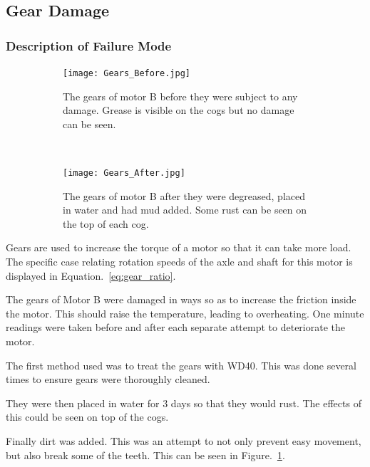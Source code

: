 
\subsection{Gear Damage}

\subsubsection{Description of Failure Mode}

\begin{figure}[t!]
    \centering
    \begin{subfigure}[t]{0.5\textwidth}
        \centering
        \texttt{[image: Gears\_Before.jpg]}
        \caption[Healthy Gears]{The gears of motor B before they were subject to any damage. Grease is visible on the cogs but no damage can be seen.}
    \end{subfigure}%
    ~ 
    \begin{subfigure}[t]{0.5\textwidth}
        \centering
         \texttt{[image: Gears\_After.jpg]}
    \caption[Damaged Gears]{The gears of motor B after they were degreased, placed in water and had mud added. Some rust can be seen on the top of each cog.}
    \end{subfigure}
    \caption[Motor Gears]{}
    \label{fig:gear_damage}
\end{figure}

Gears are used to increase the torque of a motor so that it can take more load. The specific case relating rotation speeds of the axle and shaft for this motor is displayed in Equation.~\eqref{eq:gear_ratio}.

The gears of Motor B were damaged in ways so as to increase the friction inside the motor. This should raise the temperature, leading to overheating. One minute readings were taken before and after each separate attempt to deteriorate the motor. 

The first method used was to treat the gears with WD40. This was done several times to ensure gears were thoroughly cleaned.

They were then placed in water for 3 days so that they would rust. The effects of this could be seen on top of the cogs.

Finally dirt was added. This was an attempt to not only prevent easy movement, but also break some of the teeth. This can be seen in Figure.~\ref{fig:gear_damage}.

